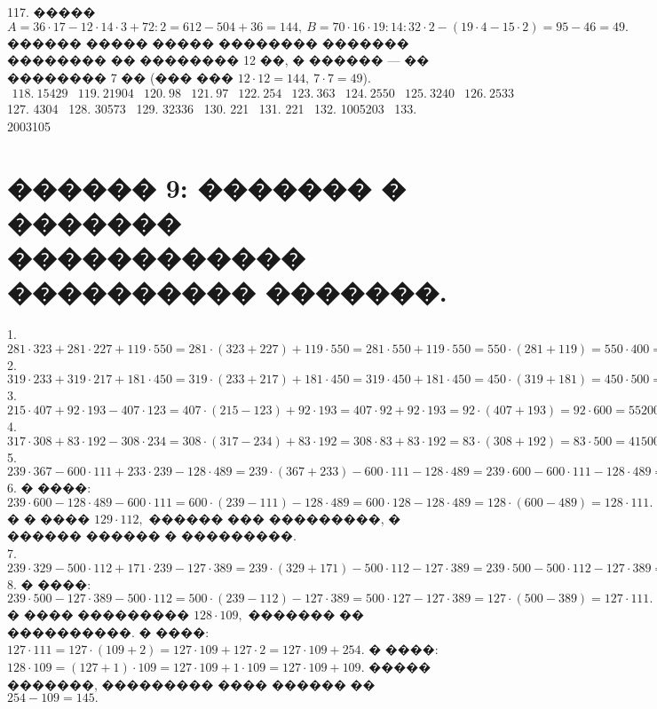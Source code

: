 \documentclass[12pt]{article}
\begin{document}
117. ����� $A=36\cdot17-12\cdot14\cdot3+72:2=612-504+36=144,\ B=70\cdot16\cdot19:14:32\cdot2-(19\cdot4-15\cdot2)=95-46=49.$ ������ ����� ����� �������� ������� �������� �� �������� 12 ��, � ������ --- �� �������� 7 �� (��� ��� $12\cdot12=144,\ 7\cdot7=49$).\\
$\begin{array}{lllllllllllll}
118.\ 15429& 119.\ 21904& 120.\ 98& 121.\ 97& 122.\ 254& 123.\ 363 & 124.\ 2550 & 125.\ 3240 & 126.\ 2533 \end{array}$\\
127. 4304 \ 128. 30573 \ 129. 32336 \ 130. 221 \ 131. 221 \ 132. 1005203 \ 133. 2003105
\newpage
\section{������ 9: ������� � ������� ������������ ���������� �������.}
1.$281\cdot323+281\cdot227+119\cdot550=281\cdot(323+227)+119\cdot550=281\cdot550+119\cdot550=550\cdot(281+119)=550\cdot400=220000.$\\
2.$319\cdot233+319\cdot217+181\cdot450=319\cdot(233+217)+181\cdot450=319\cdot450+181\cdot450=450\cdot(319+181)=450\cdot500=225000.$\\
3.$215\cdot407+92\cdot193-407\cdot123=407\cdot(215-123)+92\cdot193=407\cdot92+92\cdot193=92\cdot(407+193)=92\cdot600=55200.$\\
4.$317\cdot308+83\cdot192-308\cdot234=308\cdot(317-234)+83\cdot192=308\cdot83+83\cdot192=83\cdot(308+192)=83\cdot500=41500.$\\
5.$239\cdot367-600\cdot111+233\cdot239-128\cdot489=239\cdot(367+233)-600\cdot111-128\cdot489=239\cdot600-600\cdot111-128\cdot489=600\cdot(239-111)-128\cdot489=600\cdot128-
128\cdot489=128\cdot(600-489)=128\cdot111=14208.$\\
6. � ����: $239\cdot600-128\cdot489-600\cdot111=600\cdot(239-111)-128\cdot489=600\cdot128-128\cdot489=128\cdot(600-489)=128\cdot111.$ � � ���� $129\cdot112,$ ������ ��� ���������, � ������ ������ � ���������.\\
7. $239\cdot329-500\cdot112+171\cdot239-127\cdot389=239\cdot(329+171)-500\cdot112-127\cdot389=239\cdot500-500\cdot112-127\cdot389=500\cdot(239-112)-127\cdot389=
500\cdot127-127\cdot389=127\cdot(500-389)=127\cdot111=14097.$\\
8. � ����: $239\cdot500-127\cdot389-500\cdot112=500\cdot(239-112)-127\cdot389=500\cdot127-127\cdot389=127\cdot(500-389)=127\cdot111.$ � ���� ��������� $128\cdot109,$ ������� �� ����������. � ����: $127\cdot111=127\cdot(109+2)=127\cdot109+127\cdot2=127\cdot109+254.$ � ����: $128\cdot109=(127+1)\cdot109=127\cdot109+1\cdot109=127\cdot109+109.$ ����� �������, ��������� ���� ������ �� $254-109=145.$\\
\end{document}
